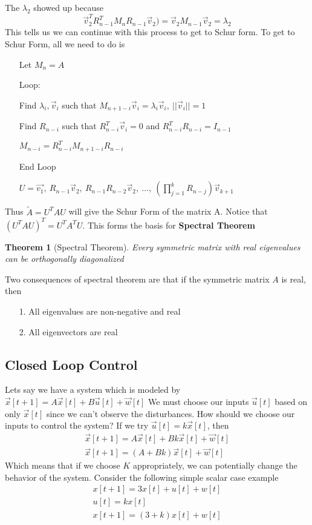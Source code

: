 \documentclass{article}
\newtheorem{theorem}{Theorem}
\begin{document}
The $\lambda_2$ showed up because
$$\vec{v}_2^TR_{n-1}^TM_nR_{n-1}\vec{v}_2)=\vec{v}_2M_{n-1}\vec{v}_2=\lambda_2$$
This tells us we can continue with this process to get to Schur form.
To get to Schur Form, all we need to do is
\begin{itemize}
    \item[] Let $M_n=A$
    \item[Loop:]
    \item[] Find $\lambda_i, \vec{v}_i$ such that $M_{n+1-i}\vec{v}_i=\lambda_i\vec{v}_i,\ ||\vec{v}_i||=1$
    \item[] Find $R_{n-i}$ such that $R_{n-i}^T\vec{v}_i=0$ and $R_{n-i}^TR_{n-i}=I_{n-1}$
    \item[] $M_{n-i} = R_{n-i}^TM_{n+1-i}R_{n-i}$
    \item[End Loop]
    \item[] $U = \vec{v_1},\ R_{n-1}\vec{v}_2,\ R_{n-1}R_{n-2}\vec{v}_2,\ ...,\ (\prod_{j=1}^{k}{R_{n-j}})\vec{v}_{k+1}$
\end{itemize}
Thus $\tilde{A}=U^TAU$ will give the Schur Form of the matrix A.
Notice that $(U^TAU)^T=U^TA^TU$. This forms the basis for \textbf{Spectral Theorem}
\begin{theorem}[Spectral Theorem]
    Every symmetric matrix with real eigenvalues can be orthogonally diagonalized
\end{theorem}
Two consequences of spectral theorem are that if the symmetric matrix $A$ is real, then
\begin{itemize}
    \item[1. ] All eigenvalues are non-negative and real
    \item[2. ] All eigenvectors are real
\end{itemize}

\subsection{Closed Loop Control}
Lets say we have a system which is modeled by $\vec{x}[t+1]=A \vec{x}[t]+B\vec{u}[t]+\vec{w}[t]$
We must choose our inputs $\vec{u}[t]$ based on only $\vec{x}[t]$ since we can't observe the disturbances. How should we choose our inputs to control the system?
If we try $\vec{u}[t]=k\vec{x}[t]$, then
\[
    \begin{array}{c}
        \vec{x}[t+1]=A\vec{x}[t]+Bk\vec{x}[t]+\vec{w}[t]\\
        \vec{x}[t+1]=(A+Bk)\vec{x}[t]+\vec{w}[t]
    \end{array}
\]
Which means that if we choose $K$ appropriately, we can potentially change the behavior of the system.
Consider the following simple scalar case example
\[
    \begin{array}{c}
        x[t+1]=3x[t]+u[t]+w[t]\\
        u[t] = kx[t]\\
        x[t+1] = (3+k)x[t]+w[t]
    \end{array}
\]
\end{document}
